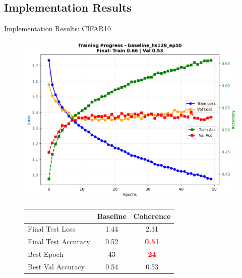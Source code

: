 \documentclass[9pt,dvipsnames]{beamer}
\begin{document}
\subsection{Implementation Results}
\begin{frame}{Implementation Results: CIFAR10}

    
    \begin{figure}[H]
        \centering
        \begin{minipage}[b]{0.48\textwidth}
            \centering
            \includegraphics[width=\textwidth]{../plots/mlp/cifar10/hs128_ep50/baseline_hs128_ep50_training_curves.png}
            {\scriptsize
            \begin{tabular}{lcc}
                \toprule
                & \textbf{Baseline} & \textbf{Coherence} \\
                \midrule
                Final Test Loss & 1.44 & 2.31 \\
                Final Test Accuracy & 0.52 & \textbf{\textcolor{red}{0.51}} \\
                Best Epoch & 43 & \textbf{\textcolor{red}{24}} \\
                Best Val Accuracy & 0.54 & 0.53 \\
                \bottomrule
            \end{tabular}
            }


\end{minipage}
\end{figure}
\end{frame}
\end{document}
